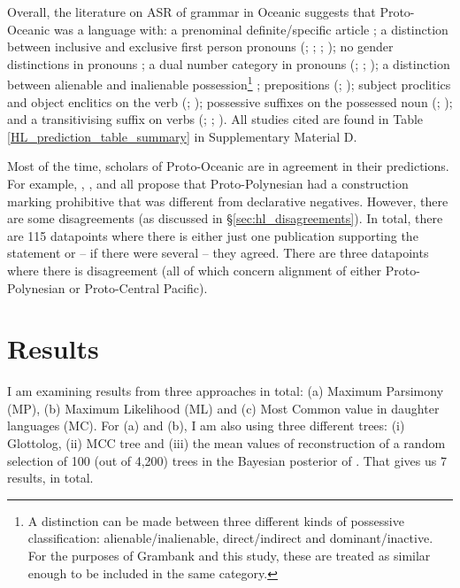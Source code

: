 \documentclass[12pt,letterpaper]{article}
\begin{document}
Overall, the literature on ASR of grammar in Oceanic suggests that Proto-Oceanic was a language with: a prenominal definite/specific article \citep[136]{crowley1985common}; a distinction between inclusive and exclusive first person pronouns (\citealt[112]{pawley1973some}; \citealt[184]{crowley1985common}; \citealt[500]{ross2004morphosyntactic}; \citealt[67, 75]{lynchrosscrowley_proto_grammar_oceanic}); no gender distinctions in pronouns \citep[498]{ross2004morphosyntactic}; a dual number category in pronouns (\citealt[498]{ross2004morphosyntactic}; \citealt[69]{lynchrosscrowley_proto_grammar_oceanic}; \citealt[173]{pawley1973some}); a distinction between alienable and inalienable possession\footnote{A distinction can be made between three different kinds of possessive classification: alienable/inalienable, direct/indirect and dominant/inactive. For the purposes of Grambank and this study, these are treated as similar enough to be included in the same category.} \citep[69]{lynchrosscrowley_proto_grammar_oceanic}; prepositions (\citealt[167]{pawley1973some}; \citealt[498]{ross2004morphosyntactic}); subject proclitics and object enclitics on the verb (\citealt[498-499]{ross2004morphosyntactic}; \citealt[83]{lynchrosscrowley_proto_grammar_oceanic}); possessive suffixes on the possessed noun (\citealt[495]{ross2004morphosyntactic}; \citealt[155]{pawley1973some}); and a transitivising suffix on verbs (\citealt[352]{pawley1970change}; \citealt[171]{pawley1973some}; \citealt[80, 92]{lynchrosscrowley_proto_grammar_oceanic}). All studies cited are found in Table \ref{HL_prediction_table_summary} in Supplementary Material D.

Most of the time, scholars of Proto-Oceanic are in agreement in their predictions. For example, \citet[142]{pawley1973some}, \citet[292]{ross2007two}, \citet[xiii, 125]{clark1973aspects} and \citet[89]{lynchrosscrowley_proto_grammar_oceanic} all propose that Proto-Polynesian had a construction marking prohibitive that was different from declarative negatives. However, there are some disagreements (as discussed in §\ref{sec:hl_disagreements}). In total, there are 115 datapoints where there is either just one publication supporting the statement or -- if there were several -- they agreed. There are three datapoints where there is disagreement (all of which concern alignment of either Proto-Polynesian or Proto-Central Pacific).

\FloatBarrier
\section{Results}
\label{results}
I am examining results from three approaches in total: (a) Maximum Parsimony (MP), (b) Maximum Likelihood (ML) and (c) Most Common value in daughter languages (MC). For (a) and (b), I am also using three different trees: (i) Glottolog, (ii) \citet{grayetal_2009} MCC tree and (iii) the mean values of reconstruction of a random selection of 100 (out of 4,200) trees in the Bayesian posterior of \citet{grayetal_2009}. That gives us 7 results, in total.
\end{document}
